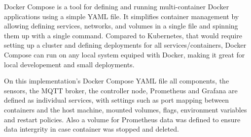 Docker Compose is a tool for defining and running multi-container Docker applications using a simple YAML file. It simplifies container management by allowing defining services, networks, and volumes in a single file and spinning them up with a single command. Compared to Kubernetes, that would require setting up a cluster and defining deployments for all services/containers, Docker Compose can run on any local system equiped with Docker, making it great for local developement and small deployments.

On this implementation's Docker Compose YAML file all components, the sensors, the MQTT broker, the controller node, Prometheus and Grafana are defined as individual services, with settings such as port mapping between containers and the host machine, mounted volumes, flags, environment variables and restart policies. Also a volume for Prometheus data was defined to ensure data intergrity in case container was stopped and deleted.

